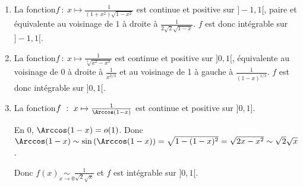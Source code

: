 {{\begin{enumerate}
\item   La fonction$f~:~x\mapsto\frac{1}{(1+x^2)\sqrt{1-x^2}}$ est continue et positive sur $]-1,1[$, paire et équivalente au voisinage de $1$ à droite à $\frac{1}{2\sqrt{2}\sqrt{1-x}}$. $f$ est donc intégrable sur $]-1,1[$.

\item  La fonction$f~:~x\mapsto\frac{1}{\sqrt[3]{x^2-x^3}}$ est continue et positive sur $]0,1[$, équivalente au voisinage de $0$ à droite à $\frac{1}{x^{2/3}}$ et au voisinage de 1 à gauche à $\frac{1}{(1-x)^{1/3}}$. $f$ est donc intégrable sur $]0,1[$.

\item  La fonction$f~:~x\mapsto\frac{1}{\Arccos(1-x)}$ est continue et positive sur $]0,1]$.

En $0$, $\Arccos(1-x) = o(1)$. Donc $\Arccos(1-x)\sim\sin\left(\Arccos(1-x)\right)=\sqrt{1-(1-x)^2}=\sqrt{2x-x^2}\sim\sqrt{2}\sqrt{x}$.

Donc $f(x)\underset{x\rightarrow0}{\sim}\frac{1}{\sqrt{2}\sqrt{x}}$ et $f$ est intégrable sur $]0,1[$.
\end{enumerate}}
}